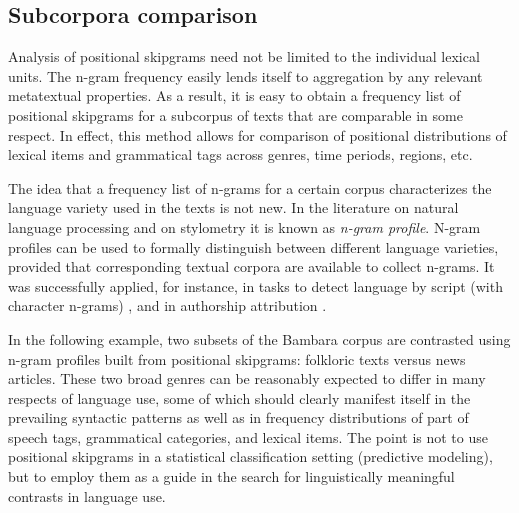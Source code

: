 \documentclass[12pt]{article}
\begin{document}
\subsection{Subcorpora comparison}



Analysis of positional skipgrams need not be limited to the individual
lexical units. The n-gram frequency easily lends itself to aggregation
by any relevant metatextual properties. As a result, it is easy to
obtain a frequency list of positional skipgrams for a subcorpus of
texts that are comparable in some respect. In effect, this method
allows for comparison of positional distributions of lexical items and
grammatical tags across genres, time periods, regions, etc.

The idea that a frequency list of n-grams for a certain corpus
characterizes the language variety used in the texts is not new. In
the literature on natural language processing and on stylometry it is
known as \textit{n-gram profile}. N-gram profiles can be used to
formally distinguish between different language varieties, provided
that corresponding textual corpora are available to collect n-grams.
It was successfully applied, for instance, in tasks to detect
language by script (with character n-grams) \autocite{cavnar1994n}, and
in authorship attribution \autocite{koppel2003exploiting}.

In the following example, two subsets of the Bambara corpus are
contrasted using n-gram profiles built from positional skipgrams:
folkloric texts versus news articles. These two broad genres can be
reasonably expected to differ in many respects of language use, some
of which should clearly manifest itself in the prevailing syntactic
patterns as well as in frequency distributions of part of speech tags,
grammatical categories, and lexical items. The point is not to use
positional skipgrams in a statistical classification setting
(predictive modeling), but to employ them as a guide in the search for
linguistically meaningful contrasts in language use.
\end{document}
